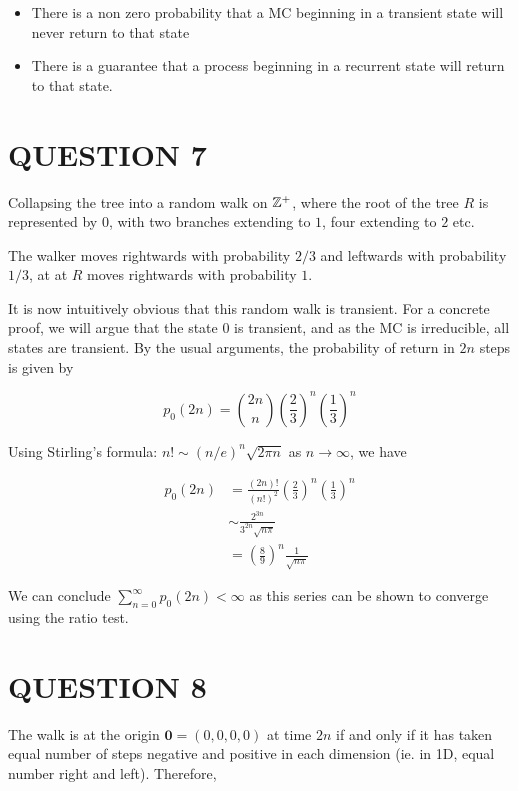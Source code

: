 \documentclass[a4paper]{article}
\begin{document}
\begin{itemize}
	\item There is a non zero probability that a MC beginning in a transient state will never return to that state
	\item There is a guarantee that a process beginning in a recurrent state will return to that state. 
\end{itemize}

\section{QUESTION 7}

Collapsing the tree into a random walk on $ \mathbb{Z}^{+} $, where the root of the tree $ R $ is represented by $ 0 $, with two branches extending to $ 1 $, four extending to $ 2 $ etc. 

The walker moves rightwards with probability $ 2/3 $ and leftwards with probability $ 1/3 $, at at $ R $ moves rightwards with probability $ 1 $.

It is now intuitively obvious that this random walk is transient. For a concrete proof, we will argue that the state $ 0 $ is transient, and as the MC is irreducible, all states are transient.
By the usual arguments, the probability of return in $ 2n $ steps is given by

\[ p_{0}(2n) = \binom{2n}{n} \left( \frac{2}{3} \right)^{n} \left( \frac{1}{3} \right)^{n}     \]

Using Stirling's formula: $ n! \sim (n/e)^{n} \sqrt{2 \pi n} $ as $ n \to \infty $, we have

\begin{align*}
p_{0}(2n) & = \frac{(2n)!}{(n!)^{2}} \left( \frac{2}{3} \right)^{n} \left( \frac{1}{3} \right)^{n} \\
& \sim \frac{2^{3n}}{3^{2n} \sqrt{n \pi} } \\
& = \left( \frac{8}{9} \right)^{n}  \frac{1}{\sqrt{n \pi}}
\end{align*}

We can conclude $ \sum_{n=0}^{\infty} p_{0}(2n) < \infty $ as this series can be shown to converge using the ratio test. 



 
\section{QUESTION 8}

The walk is at the origin $ \mathbf{0} = (0,0,0,0) $ at time $ 2n $ if and only if it has taken equal number of steps negative and positive in each dimension (ie. in 1D, equal number right and left). Therefore,
\end{document}
